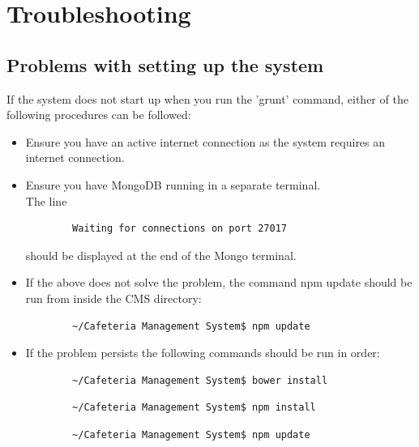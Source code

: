 \documentclass[a4paper,12pt]{report}
\begin{document}
\section{Troubleshooting}
\subsection{Problems with setting up the system}
If the system does not start up when you run the 'grunt' command, either of the following procedures can be followed:
\begin{itemize}
\item Ensure you have an active internet connection as the system requires an internet connection.
\item Ensure you have MongoDB running in a separate terminal. \\
	The line \begin{verbatim}
		Waiting for connections on port 27017
	\end{verbatim} should be displayed at the end of the Mongo terminal.
\item If the above does not solve the problem, the command npm update should be run from inside the CMS directory:
	\begin{verbatim}
		~/Cafeteria Management System$ npm update
	\end{verbatim}
\item If the problem persists the following commands should be run in order:
	\begin{verbatim}
		~/Cafeteria Management System$ bower install
	\end{verbatim} 
	\begin{verbatim}
		~/Cafeteria Management System$ npm install
	\end{verbatim} 
	\begin{verbatim}
		~/Cafeteria Management System$ npm update
	\end{verbatim}
\end{itemize}
\end{document}
